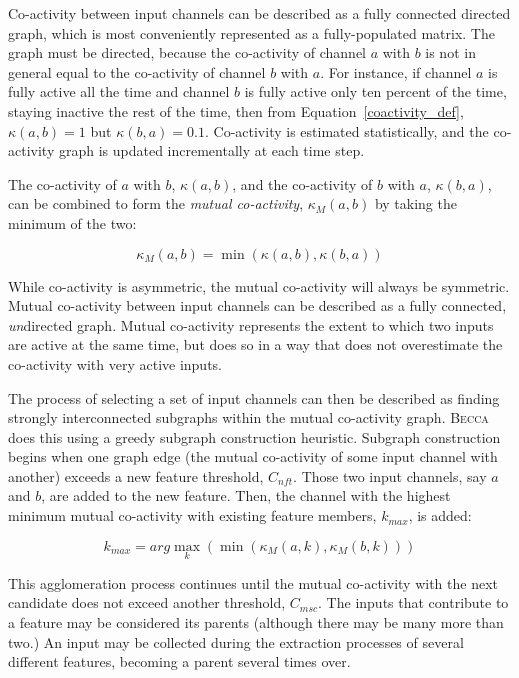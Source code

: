 Co-activity between input channels can be described as a fully connected directed graph, which is most conveniently represented as a fully-populated matrix. The graph must be directed, because the co-activity of channel $a$ with $b$ is not in general equal to the co-activity of channel $b$ with $a$. For instance, if channel $a$ is fully active all the time and channel $b$ is fully active only ten percent of the time, staying inactive the rest of the time, then from Equation~\ref{coactivity_def}, $\kappa(a,b) = 1$ but $\kappa(b,a) = 0.1$. Co-activity is estimated statistically, and the co-activity graph is updated incrementally at each time step. 

The co-activity of $a$ with $b$,  $\kappa(a,b) $,  and the co-activity of $b$ with $a$, $\kappa(b,a) $, can be combined to form the {\em mutual co-activity},  $\kappa_M(a,b) $ by taking the minimum of the two:

\begin{equation}
\kappa_M(a,b)   = \min(\kappa(a,b), \kappa(b,a)) 
\end{equation}

While co-activity is asymmetric, the mutual co-activity will always be symmetric. Mutual co-activity between input channels can be described as a fully connected, {\em un}directed graph. Mutual co-activity represents the extent to which two inputs are active at the same time, but does so in a way that does not overestimate the co-activity with very active inputs.

The process of selecting a set of input channels can then be described as finding strongly interconnected subgraphs within the mutual co-activity graph. \textsc{Becca} does this using a greedy subgraph construction heuristic. Subgraph construction begins when one graph edge (the mutual co-activity of some input channel with another) exceeds a new feature threshold, $C_{nft}$. Those two input channels, say $a$ and $b$, are added to the new feature. Then, the channel with the highest minimum mutual co-activity with existing feature members, $k_{max}$, is added:

\begin{equation}
k_{max} = arg \max_k (\min(\kappa_M(a,k), \kappa_M(b, k)))
\end{equation}

This agglomeration process continues until the mutual co-activity with the next candidate does not exceed another threshold, $C_{msc}$.  The inputs that contribute to a feature may be considered its parents (although there may be many more than two.) An input may be collected during the extraction processes of several different features, becoming a parent several times over. 

